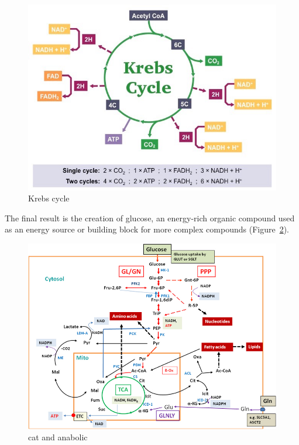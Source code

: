 \begin{figure}[htb]
	\centering
		\includegraphics{graphics/krebs-cycle_med.jpeg}
	\caption{Krebs cycle}
	\label{fig:krebs-cycle_med}
\end{figure}


The final result is the creation of glucose, an energy-rich organic compound used as an energy source or building block for more complex compounds (Figure~\ref{fig:Major-catabolic-and-anabolic-pathways-in-mammalian}). 
  
\begin{figure}
	\centering
\includegraphics[width=1.00\textwidth]{graphics/Major-catabolic-and-anabolic-pathways-in-mammalian.png}
	\caption{cat and anabolic}
	\label{fig:Major-catabolic-and-anabolic-pathways-in-mammalian}
\end{figure}

